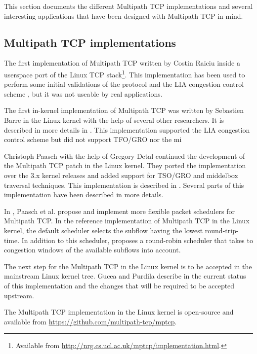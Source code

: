 This section documents the different Multipath TCP implementations \cite{draft-eardley-mptcp-implementations-survey} and several interesting applications that have been designed with Multipath TCP in mind.

\subsection{Multipath TCP implementations}

The first implementation of Multipath TCP written by Costin Raiciu inside a userspace port of the Linux TCP stack\footnote{Available from \url{http://nrg.cs.ucl.ac.uk/mptcp/implementation.html}.}. This implementation has been used to perform some initial validations of the protocol and the LIA congestion control scheme \cite{Wischik_Design:2011}, but it was not useable by real applications.

The first in-kernel implementation of Multipath TCP was written by Sebastien Barre in the Linux kernel with the help of several other researchers. It is described in more details in \cite{Barre_thesis:2011}. This implementation supported the LIA congestion control scheme but did not support TFO/GRO nor the mi

Christoph Paasch with the help of Gregory Detal continued the development of the Multipath TCP patch in the Linux kernel. They ported the implementation over the 3.x kernel releases and added support for TSO/GRO and middelbox traversal techniques. This implementation is described in \cite{Paasch_Thesis:2014}. Several parts of this implementation have been described in more details.

In \cite{Paasch_schedulers:2014}, Paasch et al. propose and implement more flexible packet schedulers for Multipath TCP. In the reference implementation of Multipath TCP in the Linux kernel, the default scheduler selects the subflow having the lowest round-trip-time. In addition to this scheduler, \cite{Paasch_schedulers:2014} proposes a round-robin scheduler that takes to congestion windows of the available subflows into account.  

The next step for the Multipath TCP in the Linux kernel is to be accepted in the mainstream Linux kernel tree. Gucea and Purdila describe in \cite{Gucea_Shaping:2015} the current status of this implementation and the changes that will be required to be accepted upstream.

The Multipath TCP implementation in the Linux kernel is open-source and available from \url{https://github.com/multipath-tcp/mptcp}.

